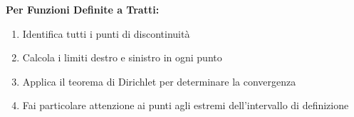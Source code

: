 \begin{strategia}
\textbf{Per Funzioni Definite a Tratti:}
\begin{enumerate}
    \item Identifica tutti i punti di discontinuità
    \item Calcola i limiti destro e sinistro in ogni punto
    \item Applica il teorema di Dirichlet per determinare la convergenza
    \item Fai particolare attenzione ai punti agli estremi dell'intervallo di definizione
\end{enumerate}
\end{strategia}
